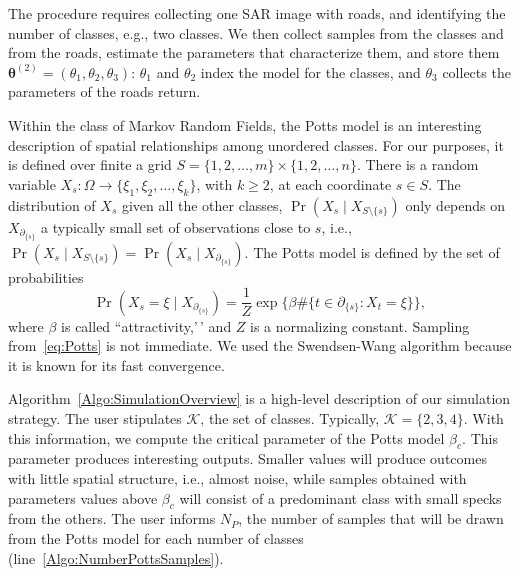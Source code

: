 \documentclass[
  journal,
]{IEEEtran}%
\begin{document}
The procedure requires collecting one SAR image with roads, and
identifying the number of classes, e.g., two classes. We then collect
samples from the classes and from the roads, estimate the parameters
that characterize them, and store them
\(\bm\theta^{(2)}=(\theta_1,\theta_2,\theta_3)\): \(\theta_1\) and
\(\theta_2\) index the model for the classes, and \(\theta_3\) collects
the parameters of the roads return.

Within the class of Markov Random Fields, the Potts model is an
interesting description of spatial relationships among unordered
classes. For our purposes, it is defined over finite a grid
\(S=\{1,2,\dots,m\}\times\{1,2,\dots,n\}\). There is a random variable
\(X_s\colon\Omega\rightarrow\{\xi_1,\xi_2,\dots,\xi_k\}\), with
\(k\geq 2\), at each coordinate \(s\in S\). The distribution of \(X_s\)
given all the other classes, \(\Pr(X_s\mid X_{S\setminus\{s\}})\) only
depends on \(X_{\partial_{\{s\}}}\) a typically small set of
observations close to \(s\), i.e.,
\(\Pr(X_s\mid X_{S\setminus\{s\}})=\Pr(X_s\mid X_{\partial_{\{s\}}})\).
The Potts model is defined by the set of probabilities \begin{equation}
\Pr(X_s=\xi\mid X_{\partial_{\{s\}}}) = 
\frac1Z \exp\big\{
\beta \# \{t\in\partial_{\{s\}}:X_t=\xi\}
\big\},
\label{eq:Potts}
\end{equation} where \(\beta\) is called ``attractivity,'\,' and \(Z\)
is a normalizing constant. Sampling from~\eqref{eq:Potts} is not
immediate. We used the Swendsen-Wang
 algorithm because it is known
for its fast convergence.

Algorithm~\ref{Algo:SimulationOverview} is a high-level description of
our simulation strategy. The user stipulates \(\mathcal K\), the set of
classes. Typically, \(\mathcal K=\{2,3,4\}\). With this information, we
compute the critical parameter of the Potts model \(\beta_c\). This
parameter produces interesting outputs. Smaller values will produce
outcomes with little spatial structure, i.e., almost noise, while
samples obtained with parameters values above \(\beta_c\) will consist
of a predominant class with small specks from the others. The user
informs \(N_P\), the number of samples that will be drawn from the Potts
model for each number of classes (line~\ref{Algo:NumberPottsSamples}).
\end{document}
